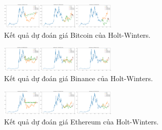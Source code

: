 \documentclass[conference]{IEEEtran}
\begin{document}
\subsubsection{}
\begin{figure}[H]
    \centering
    \includegraphics[width=0.5\textwidth]{bibliography/pictures/HWbtc.png}
    \caption{Kết quả dự đoán giá Bitcoin của Holt-Winters.}
\end{figure}
\begin{figure}[H]
    \centering
    \includegraphics[width=0.5\textwidth]{bibliography/pictures/HWbnb.png}
    \caption{Kết quả dự đoán giá Binance của Holt-Winters.}
\end{figure}
\begin{figure}[H]
    \centering
    \includegraphics[width=0.5\textwidth]{bibliography/pictures/HWeth.png}
    \caption{Kết quả dự đoán giá Ethereum của Holt-Winters.}
\end{figure}
\clearpage
\end{document}
